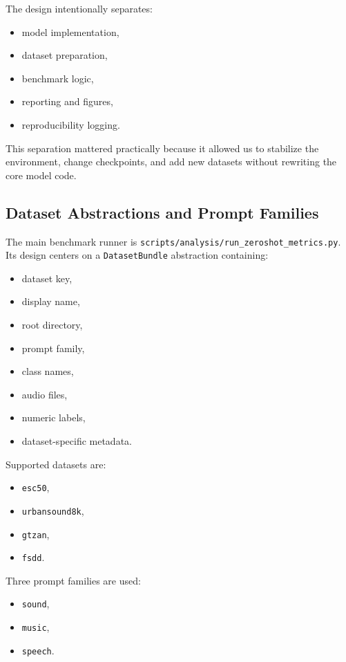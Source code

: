 \documentclass[11pt]{article}
\newcommand{\dataset}[1]{\texttt{#1}}
\begin{document}
The design intentionally separates:
\begin{itemize}[leftmargin=1.25em]
  \item model implementation,
  \item dataset preparation,
  \item benchmark logic,
  \item reporting and figures,
  \item reproducibility logging.
\end{itemize}

This separation mattered practically because it allowed us to stabilize the
environment, change checkpoints, and add new datasets without rewriting the
core model code.

\subsection{Dataset Abstractions and Prompt Families}

The main benchmark runner is
\dataset{scripts/analysis/run\_zeroshot\_metrics.py}. Its design centers on a
\dataset{DatasetBundle} abstraction containing:
\begin{itemize}[leftmargin=1.25em]
  \item dataset key,
  \item display name,
  \item root directory,
  \item prompt family,
  \item class names,
  \item audio files,
  \item numeric labels,
  \item dataset-specific metadata.
\end{itemize}

Supported datasets are:
\begin{itemize}[leftmargin=1.25em]
  \item \dataset{esc50},
  \item \dataset{urbansound8k},
  \item \dataset{gtzan},
  \item \dataset{fsdd}.
\end{itemize}

Three prompt families are used:
\begin{itemize}[leftmargin=1.25em]
  \item \dataset{sound},
  \item \dataset{music},
  \item \dataset{speech}.
\end{itemize}
\end{document}
